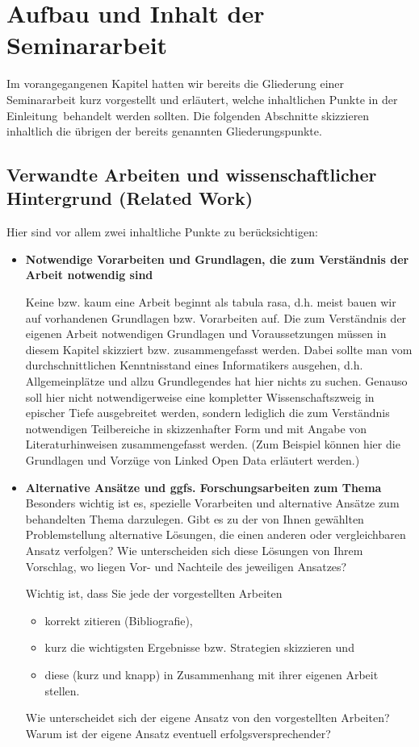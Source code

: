%
\section{Aufbau und Inhalt der Seminararbeit}
\label{sec_aufbau}

Im vorangegangenen Kapitel hatten wir bereits die Gliederung einer Seminararbeit kurz vorgestellt und erläutert, welche inhaltlichen Punkte in der \glqq Einleitung\grqq\, behandelt werden sollten.
Die folgenden Abschnitte skizzieren inhaltlich die übrigen der bereits genannten Gliederungspunkte.

\subsection{Verwandte Arbeiten und wissenschaftlicher Hintergrund (Related Work)}
Hier sind vor allem zwei inhaltliche Punkte zu berücksichtigen:
\begin{itemize}
\item {\bf Notwendige Vorarbeiten und Grundlagen, die zum Verständnis der Arbeit notwendig sind}

Keine bzw. kaum eine Arbeit beginnt als \glqq tabula rasa\grqq , d.h. meist bauen wir auf  vorhandenen Grundlagen bzw. Vorarbeiten auf.
Die zum Verständnis der eigenen Arbeit notwendigen Grundlagen und Voraussetzungen müssen in diesem Kapitel skizziert bzw. zusammengefasst werden.
Dabei sollte man vom durchschnittlichen Kenntnisstand eines Informatikers ausgehen, d.h. Allgemeinplätze und allzu Grundlegendes hat hier nichts zu suchen.
Genauso soll hier nicht notwendigerweise eine kompletter Wissenschaftszweig in epischer Tiefe ausgebreitet werden, sondern lediglich die zum Verständnis notwendigen Teilbereiche in skizzenhafter Form und mit Angabe von Literaturhinweisen zusammengefasst werden. (Zum Beispiel können hier die Grundlagen und Vorzüge von Linked Open Data erläutert werden.)

\smallskip

\item {\bf Alternative Ansätze und ggfs. Forschungsarbeiten zum Thema}
Besonders wichtig ist es, spezielle Vorarbeiten und alternative Ansätze zum behandelten Thema darzulegen.
Gibt es zu der von Ihnen gewählten Problemstellung alternative Lösungen, die einen anderen oder vergleichbaren Ansatz verfolgen? Wie unterscheiden sich diese Lösungen von Ihrem Vorschlag, wo liegen Vor- und Nachteile des jeweiligen Ansatzes?

Wichtig ist, dass Sie jede der vorgestellten Arbeiten 
\begin{itemize}
\item korrekt zitieren (Bibliografie),
\item kurz die wichtigsten Ergebnisse bzw. Strategien skizzieren und
\item diese (kurz und knapp) in Zusammenhang mit ihrer eigenen Arbeit stellen. 
\end{itemize}
Wie unterscheidet sich der eigene Ansatz von den vorgestellten Arbeiten? 
Warum ist der eigene Ansatz eventuell erfolgsversprechender? 

\end{itemize}

